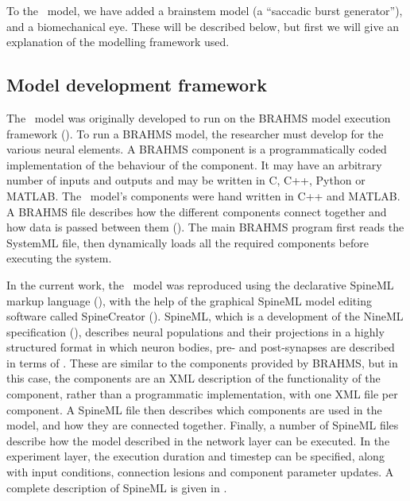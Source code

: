 \documentclass{frontiersSCNS}
\begin{document}
To the \ccg~model, we have added a brainstem model (a ``saccadic burst
generator''), and a biomechanical eye. These will be described below,
but first we will give an explanation of the modelling framework used.

\subsection{Model development framework}

The \ccg~model was originally developed to run on the BRAHMS model
execution framework
(). To run a
BRAHMS model, the researcher must develop  for
the various neural elements. A BRAHMS component is a programmatically
coded implementation of the behaviour of the component. It may have an
arbitrary number of inputs and outputs and may be written in C, C++,
Python or MATLAB. The \ccg~model's components were hand written in C++
and MATLAB. A BRAHMS  file describes how the different
components connect together and how data is passed between them
(). The main BRAHMS program first
reads the SystemML file, then dynamically loads all the required
components before executing the system.

In the current work, the \ccg~model was reproduced using the
declarative SpineML markup language (),
with the help of the graphical SpineML model editing software
called SpineCreator
(). SpineML,
which is a development of the NineML specification
(),
describes neural populations and their projections in a highly
structured format in which neuron bodies, pre- and post-synapses are
described in terms of . These are similar to the
components provided by BRAHMS, but in this case, the components are an
XML description of the functionality of the component, rather than a
programmatic implementation, with one XML file per component. A
SpineML  file then describes which components are
used in the model, and how they are connected together. Finally, a
number of SpineML  files describe how the model
described in the network layer can be executed. In the experiment
layer, the execution duration and timestep can be specified, along
with input conditions, connection lesions and component parameter
updates. A complete description of SpineML is given
in .
\end{document}
